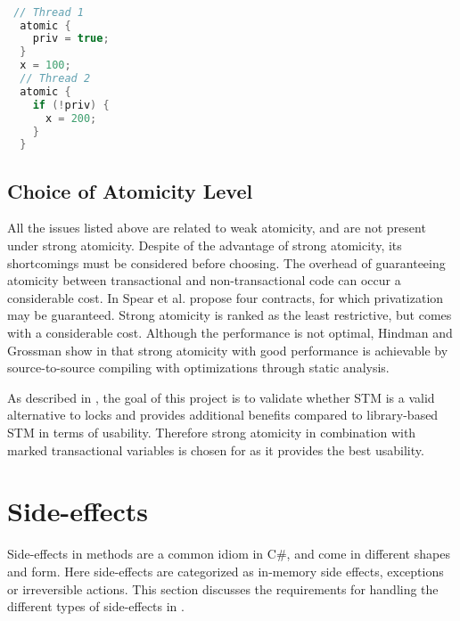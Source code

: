 \begin{lstlisting}[label=lst:privatization,
 caption={Privatization Problem},
 language=Java, 
 showspaces=false,
 showtabs=false,
 breaklines=true,
 showstringspaces=false,
 breakatwhitespace=true,
 commentstyle=\color{greencomments},
 keywordstyle=\color{bluekeywords},
 stringstyle=\color{redstrings},
 morekeywords={atomic, retry, orElse, var, get, set}]  % Start your code-block

 // Thread 1
  atomic {
    priv = true;
  }
  x = 100;
  // Thread 2
  atomic {
    if (!priv) {
      x = 200;
    }
  }
\end{lstlisting}

\subsection{Choice of Atomicity Level}
All the issues listed above are related to weak atomicity, and are not present under strong atomicity. Despite of the advantage of strong atomicity, its shortcomings must be considered before choosing. The overhead of guaranteeing atomicity between transactional and non-transactional code can occur a considerable cost\cite{spear2007privatization}. In \cite{spear2007privatization} Spear et al. propose four contracts, for which privatization may be guaranteed. Strong atomicity is ranked as the least restrictive, but comes with a considerable cost. Although the performance is not optimal, Hindman and Grossman show in \cite{hindman2006atomicity} that strong atomicity with good performance is achievable by source-to-source compiling with optimizations through static analysis.

As described in , the goal of this project is to validate whether \ac{STM} is a valid alternative to locks and provides additional benefits compared to library-based \ac{STM} in terms of usability. Therefore strong atomicity in combination with marked transactional variables is chosen for \stmname as it provides the best usability.

\section{Side-effects}\label{sec:side-effects}
Side-effects in methods are a common idiom in C\#, and come in different shapes and form. Here side-effects are categorized as in-memory side effects, exceptions or irreversible actions. This section discusses the requirements for handling the different types of side-effects in \stmname.

